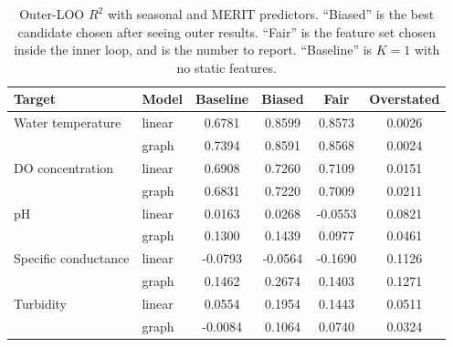 \documentclass[11pt]{article}
\begin{document}
\begin{table}[h]
\centering
\caption{Outer-LOO $R^2$ with seasonal and MERIT predictors. ``Biased'' is the best candidate chosen
after seeing outer results. ``Fair'' is the feature set chosen inside the inner loop, and is the
number to report. ``Baseline'' is $K=1$ with no static features.}
\label{tab:selection}
\begin{tabular}{llS S S S}
\toprule
Target & Model & {Baseline} & {Biased} & {\textbf{Fair}} & {Overstated} \\
\midrule
Water temperature    & linear &  0.6781 &  0.8599 &  0.8573 & 0.0026 \\
                     & graph  &  0.7394 &  0.8591 &  0.8568 & 0.0024 \\
DO concentration     & linear &  0.6908 &  0.7260 &  0.7109 & 0.0151 \\
                     & graph  &  0.6831 &  0.7220 &  0.7009 & 0.0211 \\
pH                   & linear &  0.0163 &  0.0268 & -0.0553 & 0.0821 \\
                     & graph  &  0.1300 &  0.1439 &  0.0977 & 0.0461 \\
Specific conductance & linear & -0.0793 & -0.0564 & -0.1690 & 0.1126 \\
                     & graph  &  0.1462 &  0.2674 &  0.1403 & 0.1271 \\
Turbidity            & linear &  0.0554 &  0.1954 &  0.1443 & 0.0511 \\
                     & graph  & -0.0084 &  0.1064 &  0.0740 & 0.0324 \\
\bottomrule
\end{tabular}
\end{table}
\end{document}
